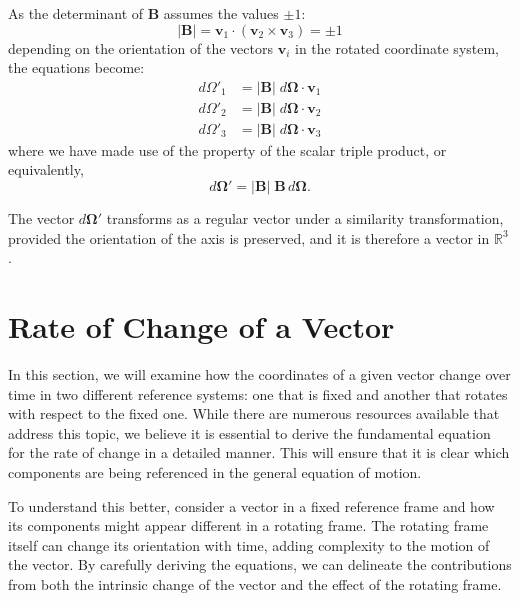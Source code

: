 \documentclass[12pt]{article}
\begin{document}
As the determinant of $\mathbf{B}$ assumes the values $\pm 1$:
\begin{equation}
  |\mathbf{B}| = \mathbf{v}_1\cdot(\mathbf{v}_2\times\mathbf{v}_3) = \pm 1
\end{equation}
depending on the orientation of the vectors $\mathbf{v}_i$ in the rotated coordinate system,
the equations become:
\begin{align}
  d\Omega'_1 &= |\mathbf{B}|\; d\boldsymbol{\Omega}\cdot\mathbf{v}_1 \\
  d\Omega'_2 &= |\mathbf{B}|\; d\boldsymbol{\Omega}\cdot\mathbf{v}_2 \\
  d\Omega'_3 &= |\mathbf{B}|\; d\boldsymbol{\Omega}\cdot\mathbf{v}_3
\end{align}
where we have made use of the property of the scalar triple product, or equivalently,
\begin{equation}
  d\boldsymbol{\Omega}' = |\mathbf{B}|\;\mathbf{B}\,d\boldsymbol{\Omega}.
\end{equation}

The vector $d\boldsymbol{\Omega}'$ transforms as a regular vector under a similarity
transformation, provided the orientation of the axis is preserved, and it is therefore a
vector in $\mathbb{R}^3$.

\section{Rate of Change of a Vector}

In this section, we will examine how the coordinates of a given vector change over time in
two different reference systems: one that is fixed and another that rotates with respect to
the fixed one. While there are numerous resources available that address this topic, we
believe it is essential to derive the fundamental equation for the rate of change in a
detailed manner. This will ensure that it is clear which components are being referenced in
the general equation of motion.

To understand this better, consider a vector in a fixed reference frame and how its
components might appear different in a rotating frame. The rotating frame itself can change
its orientation with time, adding complexity to the motion of the vector. By carefully
deriving the equations, we can delineate the contributions from both the intrinsic change of
the vector and the effect of the rotating frame.
\end{document}
